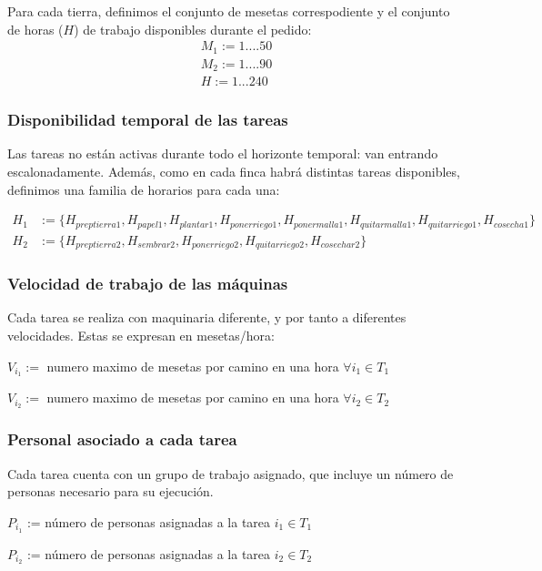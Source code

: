Para cada tierra, definimos el conjunto de mesetas correspodiente y el conjunto de horas ($H$) de trabajo disponibles durante el pedido:
    \[\begin{aligned}
        M_1:={1....50}\\
        M_2:={1....90}\\
        H:={1...240}
    \end{aligned}\]

\subsubsection{Disponibilidad temporal de las tareas}

Las tareas no están activas durante todo el horizonte temporal: van entrando escalonadamente. 
Además, como en cada finca habrá distintas tareas disponibles, definimos una familia de horarios para cada una:

\[\begin{aligned}
    H_1 &:= \{H_{preptierra1},H_{papel1},H_{plantar1},H_{ponerriego1},H_{ponermalla1},H_{quitarmalla1},H_{quitarriego1},H_{cosecha1}\}\\
    H_2 &:= \{H_{preptierra2},H_{sembrar2},H_{ponerriego2},H_{quitarriego2},H_{cosechar2}\}   
\end{aligned}\]    

\subsubsection{Velocidad de trabajo de las máquinas}

Cada tarea se realiza con maquinaria diferente, y por tanto a diferentes velocidades. Estas se expresan en mesetas/hora:
\begin{center}
$V_{i_1}:=$ numero maximo de mesetas por camino en una hora $\forall i_1 \in T_1$

$V_{i_2}:=$ numero maximo de mesetas por camino en una hora $\forall i_2 \in T_2$
\end{center}


\subsubsection{Personal asociado a cada tarea}
Cada tarea cuenta con un grupo de trabajo asignado, que incluye un número de personas necesario para su ejecución.
\begin{center}
    $P_{i_1}$ := número de personas asignadas a la tarea $i_1 \in T_1$

    $P_{i_2}$ := número de personas asignadas a la tarea $i_2 \in T_2$    
\end{center}

